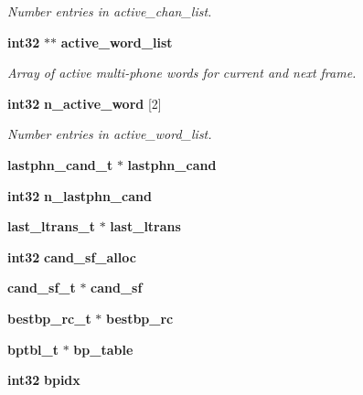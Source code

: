\begin{DoxyCompactItemize}
\begin{DoxyCompactList}\small\item\em \-Number entries in active\-\_\-chan\-\_\-list. \end{DoxyCompactList}\item 
{\bf int32} $\ast$$\ast$ {\bf active\-\_\-word\-\_\-list}
\begin{DoxyCompactList}\small\item\em \-Array of active multi-\/phone words for current and next frame. \end{DoxyCompactList}\item 
{\bf int32} {\bf n\-\_\-active\-\_\-word} [2]\label{structngram__search__s_a5c864f1fe331fc95c04e0d87a5bdf9ee}

\begin{DoxyCompactList}\small\item\em \-Number entries in active\-\_\-word\-\_\-list. \end{DoxyCompactList}\item 
{\bf lastphn\-\_\-cand\-\_\-t} $\ast$ {\bfseries lastphn\-\_\-cand}\label{structngram__search__s_a82d9662cfa82599617176eb5c4e5f15f}

\item 
{\bf int32} {\bfseries n\-\_\-lastphn\-\_\-cand}\label{structngram__search__s_ad8b16d4873706ca29a6e22e2143ae896}

\item 
{\bf last\-\_\-ltrans\-\_\-t} $\ast$ {\bfseries last\-\_\-ltrans}\label{structngram__search__s_a3f1429a7dd697c6537c353f172fea97f}

\item 
{\bf int32} {\bfseries cand\-\_\-sf\-\_\-alloc}\label{structngram__search__s_ae17322f484615fa7ecb2c40ebeceecd9}

\item 
{\bf cand\-\_\-sf\-\_\-t} $\ast$ {\bfseries cand\-\_\-sf}\label{structngram__search__s_a3304d30024b83107ed8e5e2dd770334b}

\item 
{\bf bestbp\-\_\-rc\-\_\-t} $\ast$ {\bfseries bestbp\-\_\-rc}\label{structngram__search__s_a8ab80281d54e9fa14a3631cb5b5e97a7}

\item 
{\bf bptbl\-\_\-t} $\ast$ {\bfseries bp\-\_\-table}\label{structngram__search__s_a44b5476f901d827d5e6a23a5aa11eb43}

\item 
{\bf int32} {\bfseries bpidx}\label{structngram__search__s_ad72007665bf21bb12261eb63c996a987}


\end{DoxyCompactItemize}
